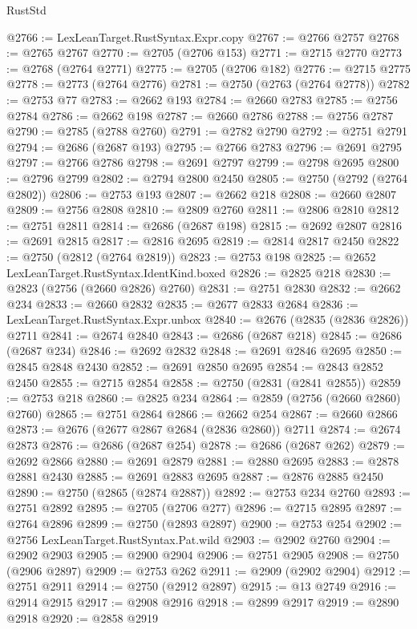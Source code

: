 \begin{lexlean}{RustStd}
\begin{coremodule}
@2766 := LexLeanTarget.RustSyntax.Expr.copy
@2767 := @2766 @2757
@2768 := @2765 @2767
@2770 := @2705 (@2706 @153)
@2771 := @2715 @2770
@2773 := @2768 (@2764 @2771)
@2775 := @2705 (@2706 @182)
@2776 := @2715 @2775
@2778 := @2773 (@2764 @2776)
@2781 := @2750 (@2763 (@2764 @2778))
@2782 := @2753 @77
@2783 := @2662 @193
@2784 := @2660 @2783
@2785 := @2756 @2784
@2786 := @2662 @198
@2787 := @2660 @2786
@2788 := @2756 @2787
@2790 := @2785 (@2788 @2760)
@2791 := @2782 @2790
@2792 := @2751 @2791
@2794 := @2686 (@2687 @193)
@2795 := @2766 @2783
@2796 := @2691 @2795
@2797 := @2766 @2786
@2798 := @2691 @2797
@2799 := @2798 @2695
@2800 := @2796 @2799
@2802 := @2794 @2800 @2450
@2805 := @2750 (@2792 (@2764 @2802))
@2806 := @2753 @193
@2807 := @2662 @218
@2808 := @2660 @2807
@2809 := @2756 @2808
@2810 := @2809 @2760
@2811 := @2806 @2810
@2812 := @2751 @2811
@2814 := @2686 (@2687 @198)
@2815 := @2692 @2807
@2816 := @2691 @2815
@2817 := @2816 @2695
@2819 := @2814 @2817 @2450
@2822 := @2750 (@2812 (@2764 @2819))
@2823 := @2753 @198
@2825 := @2652 LexLeanTarget.RustSyntax.IdentKind.boxed
@2826 := @2825 @218
@2830 := @2823 (@2756 (@2660 @2826) @2760)
@2831 := @2751 @2830
@2832 := @2662 @234
@2833 := @2660 @2832
@2835 := @2677 @2833 @2684
@2836 := LexLeanTarget.RustSyntax.Expr.unbox
@2840 := @2676 (@2835 (@2836 @2826)) @2711
@2841 := @2674 @2840
@2843 := @2686 (@2687 @218)
@2845 := @2686 (@2687 @234)
@2846 := @2692 @2832
@2848 := @2691 @2846 @2695
@2850 := @2845 @2848 @2430
@2852 := @2691 @2850 @2695
@2854 := @2843 @2852 @2450
@2855 := @2715 @2854
@2858 := @2750 (@2831 (@2841 @2855))
@2859 := @2753 @218
@2860 := @2825 @234
@2864 := @2859 (@2756 (@2660 @2860) @2760)
@2865 := @2751 @2864
@2866 := @2662 @254
@2867 := @2660 @2866
@2873 := @2676 (@2677 @2867 @2684 (@2836 @2860)) @2711
@2874 := @2674 @2873
@2876 := @2686 (@2687 @254)
@2878 := @2686 (@2687 @262)
@2879 := @2692 @2866
@2880 := @2691 @2879
@2881 := @2880 @2695
@2883 := @2878 @2881 @2430
@2885 := @2691 @2883 @2695
@2887 := @2876 @2885 @2450
@2890 := @2750 (@2865 (@2874 @2887))
@2892 := @2753 @234 @2760
@2893 := @2751 @2892
@2895 := @2705 (@2706 @277)
@2896 := @2715 @2895
@2897 := @2764 @2896
@2899 := @2750 (@2893 @2897)
@2900 := @2753 @254
@2902 := @2756 LexLeanTarget.RustSyntax.Pat.wild
@2903 := @2902 @2760
@2904 := @2902 @2903
@2905 := @2900 @2904
@2906 := @2751 @2905
@2908 := @2750 (@2906 @2897)
@2909 := @2753 @262
@2911 := @2909 (@2902 @2904)
@2912 := @2751 @2911
@2914 := @2750 (@2912 @2897)
@2915 := @13 @2749
@2916 := @2914 @2915
@2917 := @2908 @2916
@2918 := @2899 @2917
@2919 := @2890 @2918
@2920 := @2858 @2919

\end{coremodule}
\end{lexlean}
